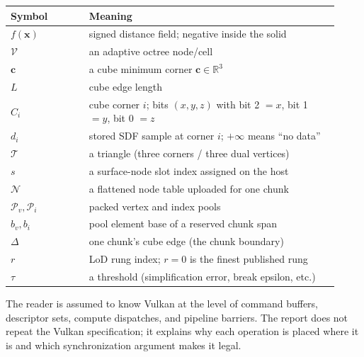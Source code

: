 \documentclass[11pt,a4paper]{article}
\newcommand{\R}{\mathbb{R}}
\newcommand{\V}{\mathcal{V}}
\newcommand{\T}{\mathcal{T}}
\newcommand{\N}{\mathcal{N}}
\begin{document}
\begin{longtable}{@{}p{0.22\linewidth}p{0.70\linewidth}@{}}
\toprule
Symbol & Meaning\\
\midrule
$f(\mathbf{x})$ & signed distance field; negative inside the solid\\
$\V$ & an adaptive octree node/cell\\
$\mathbf{c}$ & a cube minimum corner $\mathbf{c}\in\R^3$\\
$L$ & cube edge length\\
$C_i$ & cube corner $i$; bits $(x,y,z)$ with bit 2 $=x$, bit 1 $=y$, bit 0 $=z$\\
$d_i$ & stored SDF sample at corner $i$; $+\infty$ means ``no data''\\
$\T$ & a triangle (three corners / three dual vertices)\\
$s$ & a surface-node slot index assigned on the host\\
$\N$ & a flattened node table uploaded for one chunk\\
$\mathcal{P}_v,\mathcal{P}_i$ & packed vertex and index pools\\
$b_v,b_i$ & pool element base of a reserved chunk span\\
$\Delta$ & one chunk's cube edge (the chunk boundary)\\
$r$ & LoD rung index; $r=0$ is the finest published rung\\
$\tau$ & a threshold (simplification error, break epsilon, etc.)\\
\bottomrule
\end{longtable}

\noindent
The reader is assumed to know Vulkan at the level of command buffers,
descriptor sets, compute dispatches, and pipeline barriers.  The report
does not repeat the Vulkan specification; it explains why each operation
is placed where it is and which synchronization argument makes it legal.


























\end{document}
